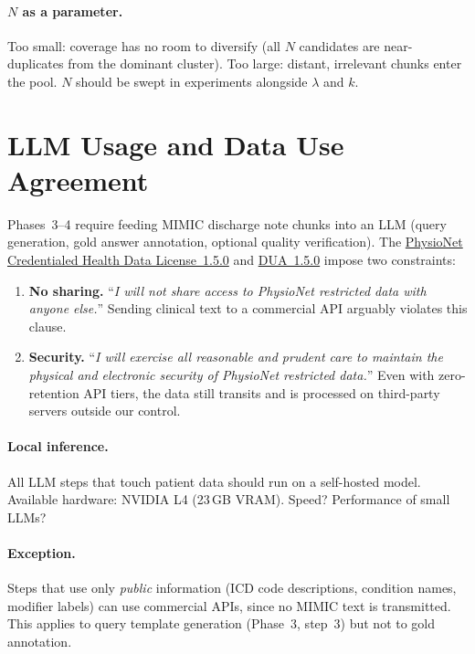 \documentclass[11pt,a4paper]{article}
\begin{document}
\paragraph{$N$ as a parameter.} Too small: coverage has no room to diversify (all $N$ candidates are near-duplicates from the dominant cluster).  Too large: distant, irrelevant chunks enter the pool.  $N$ should be swept in experiments alongside $\lambda$ and $k$.

\section{LLM Usage and Data Use Agreement}
\label{sec:llm-dua}

Phases~3--4 require feeding MIMIC discharge note chunks into an LLM (query generation, gold answer annotation, optional quality verification).  The \href{https://physionet.org/content/mimiciv/view-license/3.1/}{PhysioNet Credentialed Health Data License~1.5.0} and \href{https://physionet.org/content/mimiciv/view-dua/3.1/}{DUA~1.5.0} impose two constraints:

\begin{enumerate}[leftmargin=*]
	\item \textbf{No sharing.} ``\emph{I will not share access to PhysioNet restricted data with anyone else.}''  Sending clinical text to a commercial API arguably violates this clause.
	\item \textbf{Security.} ``\emph{I will exercise all reasonable and prudent care to maintain the physical and electronic security of PhysioNet restricted data.}''  Even with zero-retention API tiers, the data still transits and is processed on third-party servers outside our control.
\end{enumerate}

\paragraph{Local inference.}
All LLM steps that touch patient data should run on a self-hosted model.  Available hardware: NVIDIA L4 (23\,GB VRAM). Speed? Performance of small LLMs?

\paragraph{Exception.}
Steps that use only \emph{public} information (ICD code descriptions, condition names, modifier labels) can use commercial APIs, since no MIMIC text is transmitted.  This applies to query template generation (Phase~3, step~3) but not to gold annotation.
\end{document}
